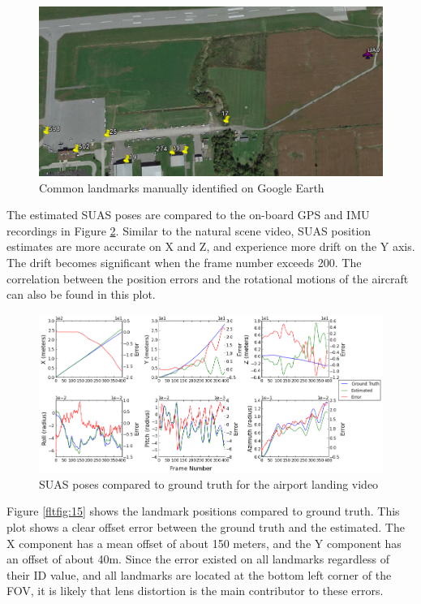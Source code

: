 \begin{figure}[h]
\centering
\includegraphics[width=13cm, keepaspectratio=true]
{./Figures/fltfig/airport/uav_and_identified_landmark.png}
\caption{Common landmarks manually identified on Google Earth }
\label{fltfig:12}
\end{figure}
\FloatBarrier 

The estimated SUAS poses are compared to the on-board GPS
and IMU recordings in Figure \ref{fltfig:13}. Similar to the natural
scene video, SUAS position estimates are more accurate on X and Z,
and experience more drift on the Y axis. The drift becomes significant
when the frame number exceeds 200. The correlation between the position errors
and the rotational motions of the aircraft can also be found in this
plot.

\begin{figure}[h]
\centering
\includegraphics[width=17cm, keepaspectratio=true]
{./Figures/fltfig/airport/Figure10.png}
\caption{SUAS poses compared to ground truth for the airport landing video}
\label{fltfig:13}
\end{figure}
\FloatBarrier

Figure \ref{fltfig:15} shows the landmark positions compared to
ground truth. This plot shows a clear offset error between the ground
truth and the estimated. The X component has a mean offset of about
150 meters, and the Y component has an offset of about 40m. Since the
error existed on all landmarks regardless of their ID value, and all
landmarks are located at the bottom left corner of the FOV, it is
likely that lens distortion is the main contributor to these errors.


